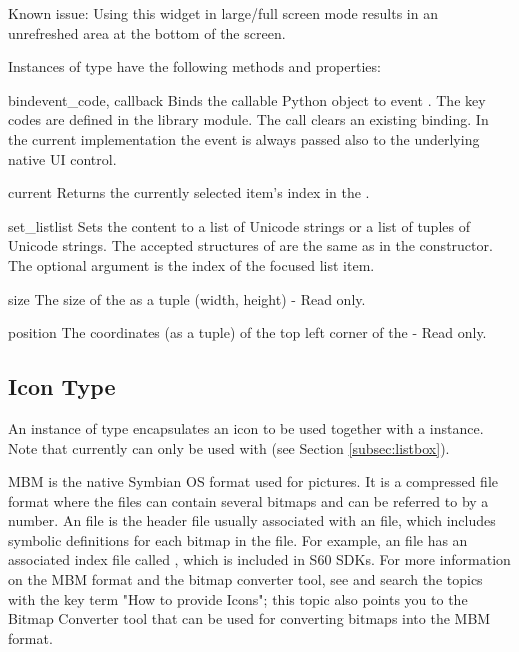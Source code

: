 \begin{notice}[note]
Known issue: Using this widget in large/full screen mode results in an unrefreshed area at the bottom of the screen.
\end{notice}

Instances of  type have the following methods and properties:

\begin{methoddesc}[Listbox]{bind}{event_code, callback}
Binds the callable Python object  to event 
. The key codes are defined in 
the  library module. The call
 clears an 
existing binding. In the current implementation the event is always passed 
also to the underlying native UI control.
\end{methoddesc}

\begin{methoddesc}[Listbox]{current}{}
Returns the currently selected item's index in the .
\end{methoddesc}

\begin{methoddesc}[Listbox]{set_list}{list}
Sets the  content to a list of Unicode strings or a
list of tuples of Unicode strings. The accepted structures of  are the
same as in the  constructor. The optional argument  is the index of the focused list item.
\end{methoddesc}

\begin{memberdesc}[Listbox]{size}
The size of the  as a tuple (width, height) - Read only.
\end{memberdesc}

\begin{memberdesc}[Listbox]{position}
The coordinates (as a tuple) of the top left corner of the  -
Read only.
\end{memberdesc}

\subsection{Icon Type}
\label{subsec:icon}
An instance of  type encapsulates an icon to be used together 
with a  instance. Note that currently  can only 
be used with  (see Section \ref{subsec:listbox}).

MBM is the native Symbian OS format used for pictures. It is a
compressed file format where the files can contain several bitmaps and
can be referred to by a number. An  file is the header file
usually associated with an  file, which includes symbolic
definitions for each bitmap in the file. For example, an
 file has an associated index file called
, which is included in S60 SDKs. For more information
on the MBM format and the bitmap converter tool, see \cite{S60Doc} and
search the topics with the key term "How to provide Icons"; this topic
also points you to the Bitmap Converter tool that can be used for
converting bitmaps into the MBM format.

